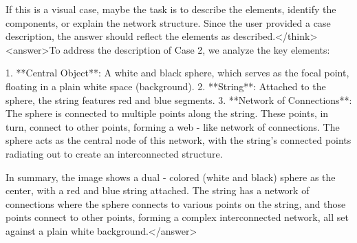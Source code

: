 If this is a visual case, maybe the task is to describe the elements, identify the components, or explain the network structure. Since the user provided a case description, the answer should reflect the elements as described.</think><answer>To address the description of Case 2, we analyze the key elements:  

1. **Central Object**: A white and black sphere, which serves as the focal point, floating in a plain white space (background).  
2. **String**: Attached to the sphere, the string features red and blue segments.  
3. **Network of Connections**: The sphere is connected to multiple points along the string. These points, in turn, connect to other points, forming a web - like network of connections. The sphere acts as the central node of this network, with the string’s connected points radiating out to create an interconnected structure.  


In summary, the image shows a dual - colored (white and black) sphere as the center, with a red and blue string attached. The string has a network of connections where the sphere connects to various points on the string, and those points connect to other points, forming a complex interconnected network, all set against a plain white background.</answer>